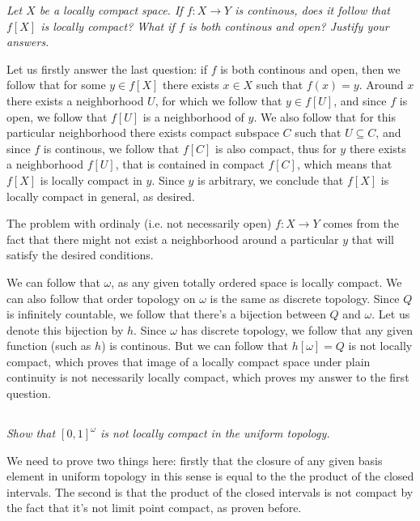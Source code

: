 \documentclass[11pt,oneside,titlepage]{book}
\begin{document}
\textit{Let $X$ be a locally compact space. If $f: X \to Y$ is continous, does it follow that
  $f[X]$ is locally compact? What if $f$ is both continous and open? Justify your answers.}

Let us firstly answer the last question: if $f$ is both continous and open, then we follow that
for some $y \in f[X]$ there exists $x \in X$ such that $f(x) = y$. Around $x$ there exists
a neighborhood $U$, for which we follow that $y \in f[U]$, and since $f$ is open, we follow that
$f[U]$ is a neighborhood of $y$. We also follow that for this particular neighborhood there
exists compact subspace  $C$ such that $U \subseteq C$, and since $f$ is continous, we follow that
$f[C]$ is also compact, thus for $y$ there exists a neighborhood $f[U]$, that is contained
in compact $f[C]$, which means that $f[X]$ is locally compact in $y$. Since $y$ is arbitrary,
we conclude that $f[X]$ is locally compact in general, as desired.

The problem with ordinaly (i.e. not necessarily open) $f: X \to Y$ comes from the fact
that there might not exist a neighborhood around a particular $y$ that will satisfy the desired
conditions.

We can follow that $\omega$, as any given totally ordered space is locally compact. We can also
follow that order topology on $\omega$ is the same as discrete topology. Since $Q$ is
infinitely countable, we follow that there's a bijection between $Q$ and $\omega$.
Let us denote this bijection by $h$. Since $\omega$ has discrete topology, we follow that
any given function (such as $h$) is continous. But we can follow that $h[\omega] = Q$ is
not locally compact, which proves that image of a locally compact space under plain
continuity is not necessarily locally compact, which proves my answer to the first question.

\subsection{}

\textit{Show that $[0, 1]^\omega$ is not locally compact in the uniform topology.}

We need to prove two things here: firstly that the closure of any given
basis element in uniform topology in this sense is equal to the the
product of the closed intervals. The second is that the product of the closed intervals is not
compact by the fact that it's not limit point compact, as proven before.
\end{document}
